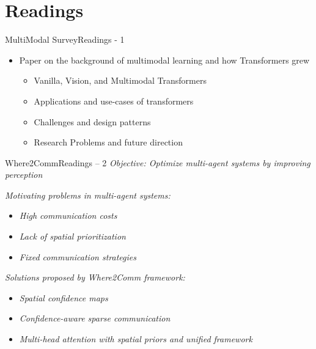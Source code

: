 \documentclass{beamer}
\begin{document}
\section{Readings}
\begin{frame}{MultiModal Survey}{Readings - 1}
\begin{itemize}
	\item Paper on the background of multimodal learning and how Transformers grew
	\begin{itemize}
		\item Vanilla, Vision, and Multimodal Transformers
		\item Applications and use-cases of transformers
		\item Challenges and design patterns
		\item Research Problems and future direction
	\end{itemize}
\end{itemize}
\end{frame}

\begin{frame}{Where2Comm}{Readings – 2}
\textit{Objective: Optimize multi-agent systems by improving perception}

\vspace{1em}
\textit{Motivating problems in multi-agent systems:}
\begin{itemize}
    \item \textit{High communication costs}
    \item \textit{Lack of spatial prioritization}
    \item \textit{Fixed communication strategies}
\end{itemize}

\vspace{1em}
\textit{Solutions proposed by Where2Comm framework:}
\begin{itemize}
    \item \textit{Spatial confidence maps}
    \item \textit{Confidence-aware sparse communication}
    \item \textit{Multi-head attention with spatial priors and unified framework}
\end{itemize}
\end{frame}
\end{document}
